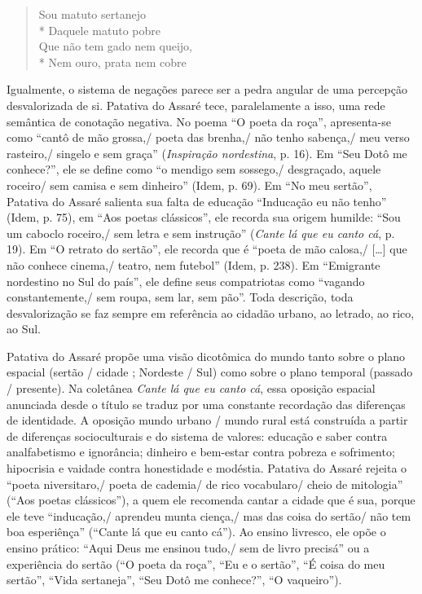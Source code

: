 \begin{verse}
Sou matuto sertanejo\\*
Daquele matuto pobre\\
Que não tem gado nem queijo,\\*
Nem ouro, prata nem cobre
\end{verse}

Igualmente, o sistema de negações parece ser a pedra angular de uma percepção
desvalorizada de si. Patativa do Assaré tece, paralelamente a isso, uma rede
semântica de conotação negativa. No poema “O poeta da roça”, apresenta-se como
“cantô de mão grossa,/ poeta das brenha,/ não tenho sabença,/ meu verso rasteiro,/
singelo e sem graça” (\textit{Inspiração nordestina}, p. 16). Em “Seu Dotô me conhece?”, ele se define como
“o mendigo sem sossego,/ desgraçado, aquele roceiro/ sem camisa e sem dinheiro”
(Idem, p. 69). Em “No meu sertão”, Patativa do Assaré salienta sua falta de
educação “Inducação eu não tenho” (Idem, p. 75), em “Aos poetas clássicos”, ele
recorda sua origem humilde: “Sou um caboclo roceiro,/ sem letra e sem instrução”
(\textit{Cante lá que eu canto cá}, p. 19). Em “O retrato do sertão”, ele recorda que é “poeta de mão calosa,/
[\ldots{}] que não conhece cinema,/ teatro, nem futebol” (Idem, p. 238). Em
“Emigrante nordestino no Sul do país”, ele define seus compatriotas como
“vagando constantemente,/ sem roupa, sem lar, sem pão”. Toda descrição, toda
desvalorização se faz sempre em referência ao cidadão urbano, ao letrado, ao
rico, ao Sul.

Patativa do Assaré propõe uma visão dicotômica do mundo tanto sobre o plano
espacial (sertão / cidade ; Nordeste / Sul) como sobre o plano temporal (passado
/ presente). Na coletânea \textit{Cante lá que eu canto cá}, essa oposição espacial
anunciada desde o título se traduz por uma constante recordação das diferenças
de identidade. A oposição mundo urbano / mundo rural está construída a partir de
diferenças socioculturais e do sistema de valores: educação e saber contra
analfabetismo e ignorância; dinheiro e bem-estar contra pobreza e sofrimento;
hipocrisia e vaidade contra honestidade e modéstia. Patativa do Assaré rejeita o
“poeta niversitaro,/ poeta de cademia/ de rico vocabularo/ cheio de mitologia”
(“Aos poetas clássicos”), a quem ele recomenda cantar a cidade que é sua, porque
ele teve “inducação,/ aprendeu munta ciença,/ mas das coisa do sertão/ não tem boa
esperiênça” (“Cante lá que eu canto cá”). Ao ensino livresco, ele opõe o ensino
prático: “Aqui Deus me ensinou tudo,/ sem de livro precisá” ou a experiência do
sertão (“O poeta da roça”, “Eu e o sertão”, “É coisa do meu sertão”, “Vida
sertaneja”, “Seu Dotô me conhece?”, “O vaqueiro”).

